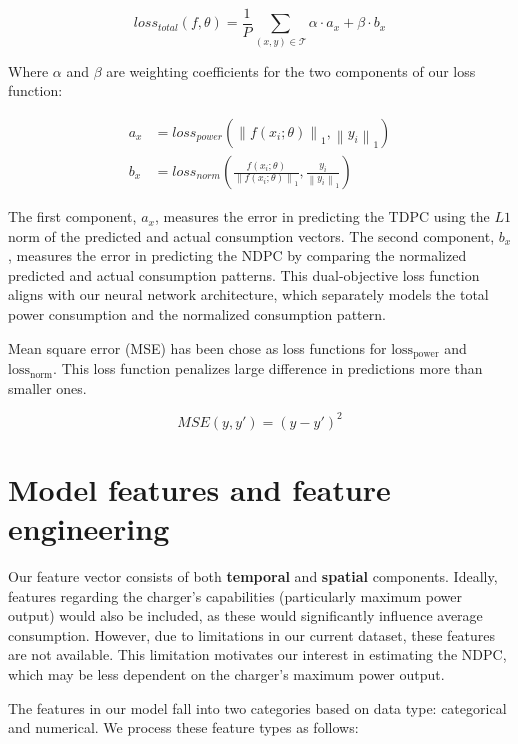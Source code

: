 \[
    \mathit{loss_{total}}(f,\theta) = \frac{1}{P} \sum_{(x,y)\in\mathcal{T}} \alpha \cdot a_x + \beta \cdot b_x
\]

Where $\alpha$ and $\beta$ are weighting coefficients for the two components of our loss function:

\[
    \begin{split}
        a_x & = \mathit{loss_{power}}
        (\left \lVert f(x_i;\theta) \right \rVert_{1}, \left \lVert y_i \right \rVert_{1}) \\
        b_x & = \mathit{loss_{norm}}
        (\frac{f(x_i;\theta)}{\left \lVert f(x_i;\theta) \right \rVert_{1}}, \frac{y_i}{\left \lVert y_i \right \rVert_{1}})
    \end{split}
\]

The first component, $a_x$, measures the error in predicting the \acrfull{TDPC} using the $L1$ norm of the predicted and actual consumption vectors. The second component, $b_x$, measures the error in predicting the \acrfull{NDPC} by comparing the normalized predicted and actual consumption patterns. This dual-objective loss function aligns with our neural network architecture, which separately models the total power consumption and the normalized consumption pattern.

Mean square error (MSE) has been chose as loss functions for $\text{loss}_\text{power}$ and $\text{loss}_\text{norm}$. This loss function penalizes large difference in predictions more than smaller ones.

\[
    MSE(y,y') = (y - y')^2
\]



\section{Model features and feature engineering}

Our feature vector consists of both \textbf{temporal} and \textbf{spatial} components. Ideally, features regarding the charger's capabilities (particularly maximum power output) would also be included, as these would significantly influence average consumption. However, due to limitations in our current dataset, these features are not available. This limitation motivates our interest in estimating the \acrfull{NDPC}, which may be less dependent on the charger's maximum power output.

The features in our model fall into two categories based on data type: categorical and numerical. We process these feature types as follows:

